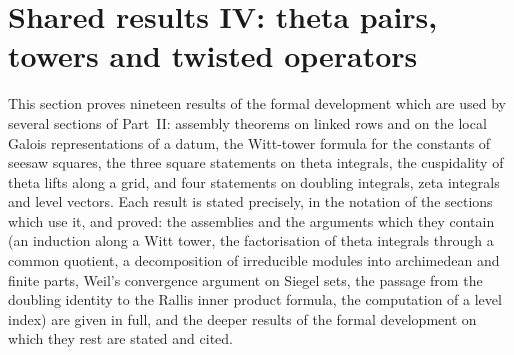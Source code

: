 \section{Shared results IV: theta pairs, towers and twisted operators}\label{sec:pf:sh-theta}

\providecommand{\shthetaLL}{\mathit{LL}}
\providecommand{\shthetaemb}{\iota}
\providecommand{\shthetaGBig}{\mathsf{GBig}}
\providecommand{\shthetaPol}{\mathcal{P}}
\providecommand{\shthetaloc}{\mathrm{loc}}
\providecommand{\shthetatw}{\mathrm{tw}}
\providecommand{\shthetafd}{\mathcal{F}}
\providecommand{\shthetaRow}{\mathsf{Row}}
\providecommand{\shthetaLinked}{\mathsf{Linked}}
\providecommand{\shthetaGood}{\mathsf{Good}}
\providecommand{\shthetadeg}{\deg}
\providecommand{\shthetaht}{\operatorname{ht}}
\providecommand{\shthetaSB}{\mathcal{S}}

This section proves nineteen results of the formal development \cite{LeanSource2026} which are used by several sections of
Part~II: assembly theorems on linked rows and on the local Galois representations of a datum, the Witt-tower formula for the
constants of seesaw squares, the three square statements on theta integrals, the cuspidality of theta lifts along a grid, and
four statements on doubling integrals, zeta integrals and level vectors. Each result is stated precisely, in the notation of the
sections which use it, and proved: the assemblies and the arguments which they contain (an induction along a Witt tower,
the factorisation of theta integrals through a common quotient, a decomposition of irreducible modules into archimedean and finite
parts, Weil's convergence argument on Siegel sets, the passage from the doubling identity to the Rallis inner product formula, the
computation of a level index) are given in full, and the deeper results of the formal development on which they rest are stated
and cited.

